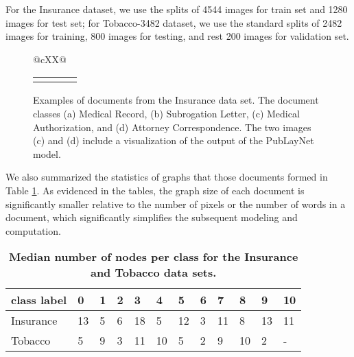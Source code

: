 \documentclass[letterpaper]{article}
\begin{document}
For the Insurance dataset, we use the  
splits of 4544 images for train set and 1280 images  for test set; for Tobacco-3482 dataset, we use the
standard splits of  2482 images for training, 800 images for testing, and rest 200 images for validation set.



\begin{figure*}[t]
\begin{center}
\def\tabularxcolumn#1{m{#1}}
\begin{tabularx}{\linewidth}{@{}cXX@{}}
\begin{tabular}{cccc}
\subfloat[Medical Record]{\texttt{[image: main/Images/gnn\_paper\_medical\_record.png]}} 
   & \subfloat[Subrogation Letter]{\texttt{[image: main/Images/gnn\_paper\_subro\_letter.png]}}
   & \subfloat[Medical Authorization]{\texttt{[image: main/Images/gnn\_paper\_medical\_authorization.png]}}
   & \subfloat[Attorney Correspondence]{\texttt{[image: main/Images/gnn\_paper\_attorney\_correspondence.png]}} \\
\end{tabular}
\end{tabularx}
\end{center}
\caption{Examples of documents from the Insurance data set. The document classes (a) Medical Record, (b) Subrogation Letter, (c) Medical Authorization, and (d) Attorney Correspondence. The two images (c) and (d) include a visualization of the output of the PubLayNet model.}
\label{fig:insurance_imgs}
\end{figure*}

We also summarized the statistics of graphs that those documents formed in Table \ref{Table1:DatasetState}. As evidenced in the tables, the graph size of each document is significantly smaller relative to the number of pixels or the number of words in a document, which significantly simplifies the subsequent modeling and computation. 
\begin{table}
\begin{tabular}{p{1.1cm}p{0.15cm}p{0.15cm}p{0.15cm}p{0.15cm}p{0.15cm}p{0.15cm}p{0.15cm}p{0.15cm}p{0.15cm}p{0.15cm}p{0.15cm}}
\toprule
 class label & 0  &  1  &  2  &  3  &  4  &  5  &  6  &  7  &  8  &  9  &  10 \\
\midrule
  Insurance & 13 &   5 &   6 &  18 &   5 &  12 &   3 &  11 &  8 &  13 &  11 \\
\midrule
 Tobacco & 5 &  9 &  3 &  11 &  10 &  5 &  2 &  9 &  10 &  2 & - \\
\bottomrule
\end{tabular}
\caption{\textbf{Median number of nodes per class for the Insurance and Tobacco data sets.}}
\label{Table1:DatasetState}
\end{table}
\end{document}

